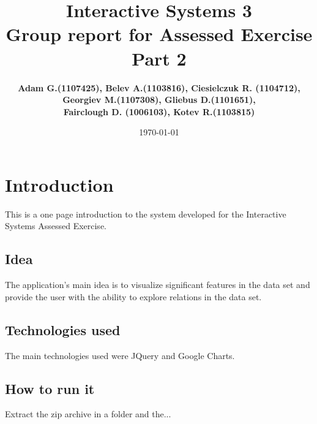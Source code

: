 \documentclass[a4paper]{article}
\title{Interactive Systems 3\\ \vspace{4mm} 
Group report for Assessed Exercise Part 2}
\author{\bf Adam G.(1107425), Belev A.(1103816), Ciesielczuk R. (1104712),\\ \bf Georgiev M.(1107308), Gliebus D.(1101651),\\ \bf Fairclough D. (1006103), Kotev R.(1103815)}
\date{\today}
\begin{document}
\maketitle
\newpage



\section{Introduction}
This is a one page introduction to the system developed for the Interactive Systems Assessed Exercise. 
\subsection{Idea}
The application's main idea is to visualize significant features in the data set and provide the user with the ability to explore relations in the data set.
\subsection{Technologies used} The main technologies used were JQuery and Google Charts.
\subsection{How to run it} Extract the zip archive in a folder and the...
\end{document}
